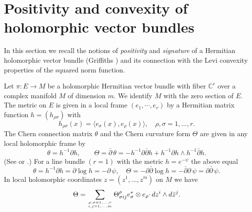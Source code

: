\documentclass[11pt]{amsart}
\numberwithin{equation}{section}
\theoremstyle{definition}
\begin{document}
\section{Positivity and convexity of holomorphic vector bundles}
\label{vector-bundles}
In this section we recall the notions of {\em positivity} and 
{\em signature} of a Hermitian holomorphic vector bundle
(Griffiths \cite{Griffiths66,Griffiths69}) and its connection with 
the Levi convexity properties of the squared norm function.

Let $\pi\colon E\to M$ be a holomorphic Hermitian vector bundle 
with fiber ${\mathbb{C}}^r$ over a complex manifold $M$ of dimension $m$.
We identify $M$ with the zero section of $E$.
The metric on $E$ is given in a local frame $(e_1,\cdots,e_r)$
by a Hermitian matrix function $h=(h_{\rho\sigma})$ with 
\[
		h_{\rho\sigma}(x)= \langle e_\sigma(x),e_\rho(x) \rangle, \quad \rho,\sigma=1,\ldots,r.
\]
The Chern connection matrix $\theta$ and the Chern curvature form $\Theta$
are given in any local holomorphic frame by 
\[
	\theta= h^{-1}{\partial} h, \qquad 
	\Theta={\bar\partial} \,\theta = -h^{-1}{\partial}{\bar\partial} h + h^{-1}{\partial} h \wedge h^{-1}{\bar\partial} h. 
\]
(See \cite[Chapter 5]{Dem-book} or \cite[Chapter III]{Wells}.)
For a line bundle $(r=1)$ with the metric $h=e^{-\psi}$ the above equal 
\[
	\theta= h^{-1}{\partial} h = {\partial}\log h = -{\partial}\,\psi, 
	\quad  \Theta= - {\partial}{\bar\partial} \log h = -{\bar\partial}{\partial}\,\psi={\partial}{\bar\partial}\,\psi.
\]
In local holomorphic coordinates $z=(z^1,\ldots,z^m)$ on $M$ we have
\[
	\Theta= \sum_{{\genfrac{}{}{0pt}{}{{\rho,\sigma=1,\ldots,r}}{{i,j=1,\ldots,m}}}} 
	      \Theta^\rho_{\sigma i j} e^*_\sigma \otimes e_\rho\cdotp dz^i\wedge d\bar z^j.
\]
\end{document}
